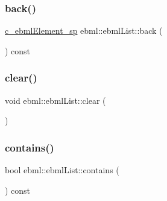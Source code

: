 \mbox{\label{classebml_1_1ebmlList_a3ae9e052dca738b1a3e66c9da0e47e76}} 
\subsubsection{\texorpdfstring{back()}{back()}\hspace{0.1cm}{\footnotesize\ttfamily [2/2]}}
{\footnotesize\ttfamily \mbox{\hyperlink{namespaceebml_a2deef4e8071531b32e3533f1bf978917}{c\+\_\+ebml\+Element\+\_\+sp}} ebml\+::ebml\+List\+::back (\begin{DoxyParamCaption}{ }\end{DoxyParamCaption}) const}

\mbox{\label{classebml_1_1ebmlList_a757aaf37e69f54397c74fab476c0cdc1}} 
\subsubsection{\texorpdfstring{clear()}{clear()}}
{\footnotesize\ttfamily void ebml\+::ebml\+List\+::clear (\begin{DoxyParamCaption}{ }\end{DoxyParamCaption})}

\mbox{\label{classebml_1_1ebmlList_abab676e25a152cba3818e54d32cbfe35}} 
\subsubsection{\texorpdfstring{contains()}{contains()}}
{\footnotesize\ttfamily bool ebml\+::ebml\+List\+::contains (\begin{DoxyParamCaption}\item[{const \mbox{\hyperlink{namespaceebml_a2deef4e8071531b32e3533f1bf978917}{c\+\_\+ebml\+Element\+\_\+sp}} \&}]{ }\end{DoxyParamCaption}) const}

\mbox{\label{classebml_1_1ebmlList_a5b2db67357ddbee4801414fed4fb1640}} 
